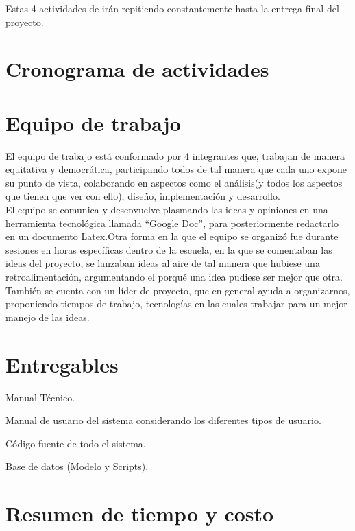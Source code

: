 Estas 4 actividades de irán repitiendo constantemente hasta la entrega final del proyecto.

\section{Cronograma de actividades}


\section{Equipo de trabajo}
El equipo de trabajo está conformado por 4 integrantes que, trabajan de manera equitativa y democrática, participando todos de tal manera que cada uno expone su punto de vista,  colaborando en aspectos como el análisis(y todos los aspectos que tienen que ver con ello), diseño, implementación y desarrollo.\\
El equipo se comunica y desenvuelve plasmando las ideas y opiniones en una herramienta tecnológica llamada “Google Doc”, para posteriormente redactarlo en un documento Latex.Otra forma en la que el equipo se organizó fue durante sesiones en horas específicas dentro de la escuela, en la que se comentaban las ideas del proyecto, se lanzaban ideas al aire de tal manera que hubiese una retroalimentación, argumentando el porqué una idea pudiese ser mejor que otra.\\
También se cuenta con un líder de proyecto, que en general ayuda a organizarnos, proponiendo tiempos de trabajo, tecnologías en las cuales trabajar para un mejor manejo de las ideas.	

\section{Entregables}
\textbullet Manual Técnico.

\textbullet Manual de usuario del sistema considerando los diferentes tipos de usuario.

\textbullet Código fuente de todo el sistema.

\textbullet Base de datos (Modelo y Scripts).
\section{Resumen de tiempo y costo}
